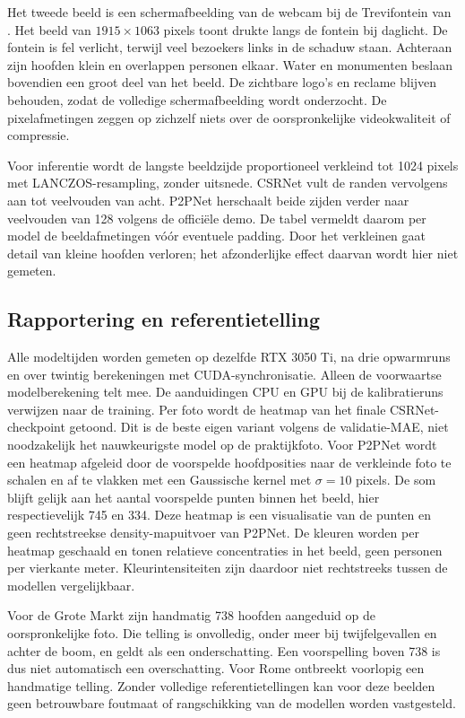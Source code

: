 Het tweede beeld is een schermafbeelding van de webcam bij de Trevifontein van \textcite{SkylineWebcamsTrevi}. Het beeld van \(1915 \times 1063\) pixels toont drukte langs de fontein bij daglicht. De fontein is fel verlicht, terwijl veel bezoekers links in de schaduw staan. Achteraan zijn hoofden klein en overlappen personen elkaar. Water en monumenten beslaan bovendien een groot deel van het beeld. De zichtbare logo's en reclame blijven behouden, zodat de volledige schermafbeelding wordt onderzocht. De pixelafmetingen zeggen op zichzelf niets over de oorspronkelijke videokwaliteit of compressie.

Voor inferentie wordt de langste beeldzijde proportioneel verkleind tot 1024 pixels met LANCZOS-resampling, zonder uitsnede. CSRNet vult de randen vervolgens aan tot veelvouden van acht. P2PNet herschaalt beide zijden verder naar veelvouden van 128 volgens de officiële demo. De tabel vermeldt daarom per model de beeldafmetingen vóór eventuele padding. Door het verkleinen gaat detail van kleine hoofden verloren; het afzonderlijke effect daarvan wordt hier niet gemeten.

\subsection{Rapportering en referentietelling}

Alle modeltijden worden gemeten op dezelfde RTX 3050 Ti, na drie opwarmruns en over twintig berekeningen met CUDA-synchronisatie. Alleen de voorwaartse modelberekening telt mee. De aanduidingen CPU en GPU bij de kalibratieruns verwijzen naar de training. Per foto wordt de heatmap van het finale CSRNet-checkpoint getoond. Dit is de beste eigen variant volgens de validatie-MAE, niet noodzakelijk het nauwkeurigste model op de praktijkfoto. Voor P2PNet wordt een heatmap afgeleid door de voorspelde hoofdposities naar de verkleinde foto te schalen en af te vlakken met een Gaussische kernel met \(\sigma=10\) pixels. De som blijft gelijk aan het aantal voorspelde punten binnen het beeld, hier respectievelijk 745 en 334. Deze heatmap is een visualisatie van de punten en geen rechtstreekse density-mapuitvoer van P2PNet. De kleuren worden per heatmap geschaald en tonen relatieve concentraties in het beeld, geen personen per vierkante meter. Kleurintensiteiten zijn daardoor niet rechtstreeks tussen de modellen vergelijkbaar.

Voor de Grote Markt zijn handmatig 738 hoofden aangeduid op de oorspronkelijke foto. Die telling is onvolledig, onder meer bij twijfelgevallen en achter de boom, en geldt als een onderschatting. Een voorspelling boven 738 is dus niet automatisch een overschatting. Voor Rome ontbreekt voorlopig een handmatige telling. Zonder volledige referentietellingen kan voor deze beelden geen betrouwbare foutmaat of rangschikking van de modellen worden vastgesteld.

